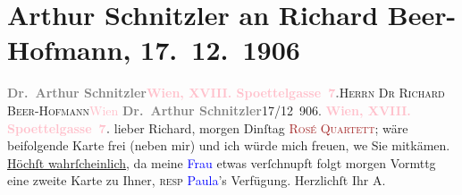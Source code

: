 

               \section[Arthur Schnitzler an Richard Beer-Hofmann, 17. 12. 1906]{ Arthur Schnitzler an Richard Beer-Hofmann, 17. 12. 1906}\nopagebreak{}\rehead{ }\normalsize\beginnumbering{} \toendnotes[C]{\smallbreak\pagebreak[2]} 
\pstart{}{\pb}\textcolor{gray}{\textbf{Dr. Arthur Schnitzler}}\pend{}\pstart{}\textcolor{gray}{\textbf{\textcolor{pink}{Wien, XVIII. Spoettelgasse 7}{}\ledrightnote{\textcolor{pink}{Edmund-Weiß-Gasse}}.}}\pend{}{\bigskip}\pstart{}{\pb}\textsc{Herrn Dr Richard Beer-Hofmann}\pend{}\pstart{}\textcolor{pink}{Wien}{}\ledrightnote{\textcolor{pink}{Wien}}\pend{}{\bigskip}\pstart
           \noindent{}{\pb}\textcolor{gray}{\textbf{Dr. Arthur Schnitzler}}\hfill 17/12 906.\pend
           \pstart
           \textcolor{gray}{\textbf{\textcolor{pink}{Wien, XVIII. Spoettelgasse 7}{}\ledrightnote{\textcolor{pink}{Edmund-Weiß-Gasse}}.}}\pend
           \pstart
           lieber Richard, morgen Dinſtag{ }\textsc{\textcolor{brown}{Rosé Quartett}{}\ledrightnote{\textcolor{brown}{Rosé-Quartett}}}; wäre beifolgende Karte frei (neben mir) und ich würde mich freuen, we{\geminationn} Sie mitkämen. \uline{Höchſt
                  wahrſcheinlich}, da meine \textcolor{blue}{Frau}{}\ledrightnote{\textcolor{blue}{Olga Schnitzler}} etwas
               verſchnupft folgt morgen Vormttg eine zweite Karte zu Ihner, \textsc{resp}{ }\textcolor{blue}{Paula}{}\ledrightnote{\textcolor{blue}{Paula Beer-Hofmann}}’s Verfügung.\pend
           \pstart Herzlichſt Ihr \spacefill\mbox{A.}\pend{}\endnumbering{}  
      